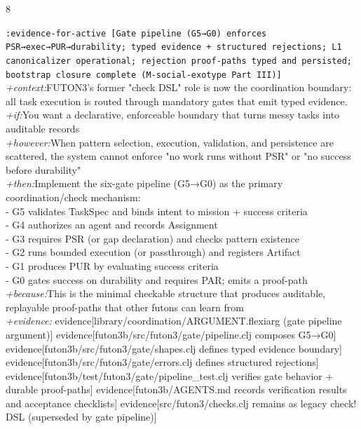 \documentclass[landscape]{article}
\newcommand{\flexitag}[1]{\textcolor[gray]{0.35}{\textit{#1}}}
\newenvironment{devmapactive}{%
  \def\FrameCommand{\colorbox{devmapactivebg}}%
  \setlength{\fboxsep}{2pt}%
  \MakeFramed{\advance\hsize-\width \FrameRestore}%
}{\endMakeFramed}
\begin{document}
\begin{paracol}{8}
\begin{devmapactive}
  \texttt{:\allowbreak{}evidence-\allowbreak{}for-\allowbreak{}active [Gate pipeline (G5→G0) enforces PSR→exec→PUR→durability;\allowbreak{} typed evidence +\allowbreak{} structured rejections;\allowbreak{} L1 canonicalizer operational;\allowbreak{} rejection proof-\allowbreak{}paths typed and persisted;\allowbreak{} bootstrap closure complete (M-\allowbreak{}social-\allowbreak{}exotype Part III)]}\\
  \flexitag{+context:}FUTON3’s former "check DSL" role is now the coordination boundary: all task execution is routed through mandatory gates that emit typed evidence.\\
  \flexitag{+if:}You want a declarative, enforceable boundary that turns messy tasks into auditable records\\
  \flexitag{+however:}When pattern selection, execution, validation, and persistence are scattered, the system cannot enforce "no work runs without PSR" or "no success before durability"\\
  \flexitag{+then:}Implement the six-gate pipeline (G5→G0) as the primary coordination/check mechanism:\\
    - G5 validates TaskSpec and binds intent to mission + success criteria\\
    - G4 authorizes an agent and records Assignment\\
    - G3 requires PSR (or gap declaration) and checks pattern existence\\
    - G2 runs bounded execution (or passthrough) and registers Artifact\\
    - G1 produces PUR by evaluating success criteria\\
    - G0 gates success on durability and requires PAR; emits a proof-path\\
  \flexitag{+because:}This is the minimal checkable structure that produces auditable, replayable proof-paths that other futons can learn from\\
  \flexitag{+evidence:} evidence[library/coordination/ARGUMENT.flexiarg (gate pipeline argument)] evidence[futon3b/src/futon3/gate/pipeline.clj composes G5→G0] evidence[futon3b/src/futon3/gate/shapes.clj defines typed evidence boundary] evidence[futon3b/src/futon3/gate/errors.clj defines structured rejections] evidence[futon3b/test/futon3/gate/pipeline\_test.clj verifies gate behavior + durable proof-paths] evidence[futon3b/AGENTS.md records verification results and acceptance checklists] evidence[src/futon3/checks.clj remains as legacy check! DSL (superseded by gate pipeline)]\\

\end{devmapactive}
\end{paracol}
\end{document}
